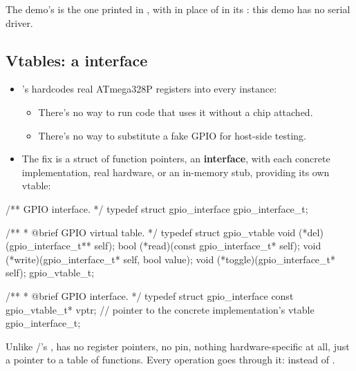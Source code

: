 
\noindent The demo's  is the one printed in , with
 in place of  in its :
this demo has no serial driver.

\subsection{Vtables: a  interface}
\label{c10:a:6}
\begin{itemize}
  \item {}'s  hardcodes real ATmega328P registers into every instance:
  \begin{itemize}
    \item There's no way to run code that uses it without a chip attached.
    \item There's no way to substitute a fake GPIO for host-side testing.
  \end{itemize}
  \item The fix is a struct of function pointers, an \textbf{interface}, with each concrete
    implementation, real hardware, or an in-memory stub, providing its own vtable:
\end{itemize}

\begin{ccode}
/** GPIO interface. */
typedef struct gpio_interface gpio_interface_t;

/**
 * @brief GPIO virtual table.
 */
typedef struct gpio_vtable
{
    void (*del)(gpio_interface_t** self);
    bool (*read)(const gpio_interface_t* self);
    void (*write)(gpio_interface_t* self, bool value);
    void (*toggle)(gpio_interface_t* self);
} gpio_vtable_t;

/**
 * @brief GPIO interface.
 */
typedef struct gpio_interface
{
    const gpio_vtable_t* vptr;   // pointer to the concrete implementation's vtable
} gpio_interface_t;
\end{ccode}

\noindent Unlike /'s ,  has no
register pointers, no pin, nothing hardware-specific at all, just a pointer to a table of
functions. Every operation goes through it:  instead of
.

